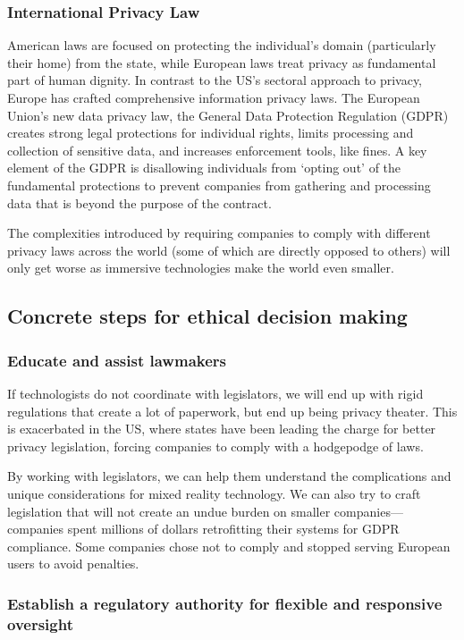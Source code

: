 \subsubsection{International Privacy Law}

American laws are focused on protecting the individual's domain (particularly their home) from the state, while European laws treat privacy as fundamental part of human dignity.
In contrast to the US's sectoral approach to privacy, Europe has crafted comprehensive information privacy laws. The European Union's new data privacy law, the General Data Protection Regulation (GDPR) creates strong legal protections for individual rights, limits processing and collection of sensitive data, and increases enforcement tools, like fines. A key element of the GDPR is disallowing individuals from `opting out' of the fundamental protections to prevent companies from gathering and processing data that is beyond the purpose of the contract.

The complexities introduced by requiring companies to comply with different privacy laws across the world (some of which are directly opposed to others) will only get worse as immersive technologies make the world even smaller.



\subsection{Concrete steps for ethical decision making}\label{sec:steps}
\subsubsection{Educate and assist lawmakers}
If technologists do not coordinate with legislators, we will end up with rigid regulations that create a lot of paperwork, but end up being privacy theater. This is exacerbated in the US, where states have been leading the charge for better privacy legislation, forcing companies to comply with a hodgepodge of laws.

By working with legislators, we can help them understand the complications and unique considerations for mixed reality technology. We can also try to craft legislation that will not create an undue burden on smaller companies---companies spent millions of dollars retrofitting their systems for GDPR compliance. Some companies chose not to comply and stopped serving European users to avoid penalties.

\subsubsection{Establish a regulatory authority for flexible and responsive oversight}

